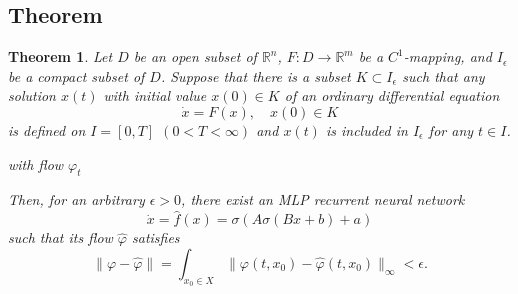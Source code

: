 \documentclass{article}
\newtheorem{theorem}{Theorem}
\theoremstyle{definition}
\theoremstyle{remark}
\begin{document}
\subsection{Theorem}
\begin{theorem}
Let $D$ be an open subset of $\mathbb{R}^n$, $F : D \to \mathbb{R}^m$ be a $C^1$-mapping, and $I_\epsilon$ be a compact subset of $D$.
Suppose that there is a subset $K \subset I_\epsilon$ such that any solution $x(t)$ with initial value $x(0) \in K$ of an ordinary differential equation
\begin{equation}\label{eq:5}
    \dot{x} = F(x), \quad x(0) \in K
\end{equation}
is defined on $I = [0, T]$ $(0 < T < \infty)$ and $x(t)$ is included in $I_\epsilon$ for any $t \in I$.

with flow $\varphi_t$ 


 Then, for an arbitrary $\epsilon > 0$, there exist an MLP recurrent neural network 
 \begin{equation}
\dot x = \hat f(x) = \sigma(A\sigma(Bx+b)+a)
\end{equation}
such that its flow $\hat \varphi$ satisfies
\begin{equation}
\|\varphi-\hat \varphi\| = \int_{x_0\in X}\|\varphi(t,x_0)-\hat \varphi(t,x_0)\|_\infty<\epsilon.
\end{equation}
\end{theorem}
\end{document}
